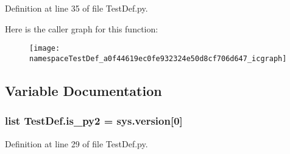 Definition at line 35 of file Test\-Def.\-py.



Here is the caller graph for this function\-:\nopagebreak
\begin{figure}[H]
\begin{center}
\leavevmode
\texttt{[image: namespaceTestDef\_a0f44619ec0fe932324e50d8cf706d647\_icgraph]}
\end{center}
\end{figure}




\subsection{Variable Documentation}
\hypertarget{namespaceTestDef_a4e87724b7a6a117c2cca22c557936868}{
\subsubsection[{is\-\_\-py2}]{\setlength{\rightskip}{0pt plus 5cm}list Test\-Def.\-is\-\_\-py2 = sys.\-version\mbox{[}0\mbox{]}}}\label{namespaceTestDef_a4e87724b7a6a117c2cca22c557936868}


Definition at line 29 of file Test\-Def.\-py.

